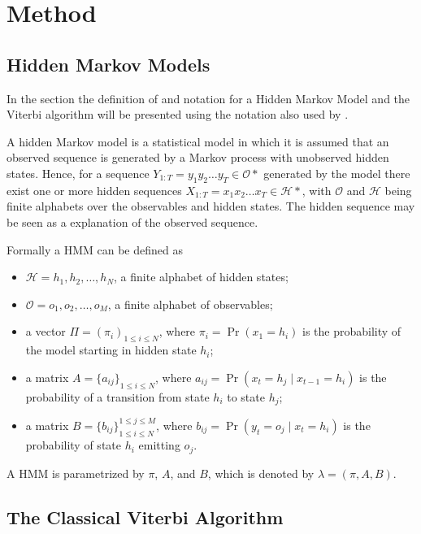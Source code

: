 \chapter{Method}

\section{Hidden Markov Models}

In the section the definition of and notation for a Hidden Markov Model and the
Viterbi algorithm will be presented using the notation also used by
\citet{sand2013ziphmmlib}.

A hidden Markov model is a statistical model in which it is assumed that an
observed sequence is generated by a Markov process with unobserved hidden
states. Hence, for a sequence $Y_{1:T} = y_1y_2\dots{}y_T \in \mathcal{O*}$
generated by the model there exist one or more hidden sequences
$X_{1:T} = x_1x_2\dots{}x_T \in \mathcal{H*}$, with $\mathcal{O}$ and
$\mathcal{H}$ being finite alphabets over the observables and hidden
states. The hidden sequence may be seen as a explanation of the observed
sequence.

Formally a HMM can be defined as
\begin{itemize}
\item $\mathcal{H} = {h_1, h_2, \dots, h_N}$, a finite alphabet of hidden
  states;
\item $\mathcal{O} = {o_1, o_2, \dots, o_M}$, a finite alphabet of observables;
\item a vector $\Pi = {(\pi_i)}_{1 \le i \le N}$, where $\pi_i = \Pr(x_1 =
  h_i)$ is the probability of the model starting in hidden state $h_i$;
\item a matrix $A = {\{a_{ij}\}}_{1 \le i \le N}$, where $a_{ij} = \Pr(x_t
  = h_j \mid x_{t - 1} = h_i)$ is the probability of a transition from state
  $h_i$ to state $h_j$;
\item a matrix $B = {\{b_{ij}\}}_{1 \le i \le N}^{1 \le j \le M}$, where
  $b_{ij} = \Pr(y_t = o_j \mid x_t = h_i)$ is the probability of state
  $h_i$ emitting $o_j$.
\end{itemize}

A HMM is parametrized by $\pi$, $A$, and $B$, which is denoted by $\lambda =
(\pi, A, B)$.

\section{The Classical Viterbi Algorithm}
\label{sec:class-viterbi-algor}

